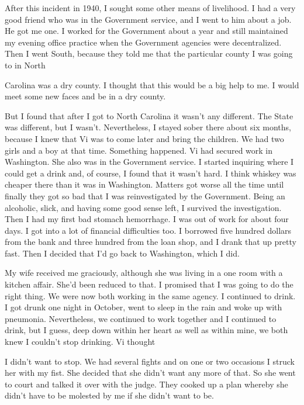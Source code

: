 \begin{biblechapter}
After this incident in 1940, I sought some other means of livelihood. I had a very good friend who was in the Government service, and I went to him about a job. He got me one. I worked for the Government about a year and still maintained my evening office practice when the Government agencies were decentralized. Then I went South, because they told me that the particular county I was going to in North

Carolina was a dry county. I thought that this would be a big help to me. I would meet some new faces and be in a dry county.

But I found that after I got to North Carolina it wasn’t any different. The State was different, but I wasn’t. Nevertheless, I stayed sober there about six months, because I knew that Vi was to come later and bring the children. We had two girls and a boy at that time. Something happened. Vi had secured work in Washington. She also was in the Government service. I started inquiring where I could get a drink and, of course, I found that it wasn’t hard. I think whiskey was cheaper there than it was in Washington. Matters got worse all the time until finally they got so bad that I was reinvestigated by the Government. Being an alcoholic, slick, and having some good sense left, I survived the investigation. Then I had my first bad stomach hemorrhage. I was out of work for about four days. I got into a lot of financial difficulties too. I borrowed five hundred dollars from the bank and three hundred from the loan shop, and I drank that up pretty fast. Then I decided that I’d go back to Washington, which I did.

My wife received me graciously, although she was living in a one room with a kitchen affair. She’d been reduced to that. I promised that I was going to do the right thing. We were now both working in the same agency. I continued to drink. I got drunk one night in October, went to sleep in the rain and woke up with pneumonia. Nevertheless, we continued to work together and I continued to drink, but I guess, deep down within her heart as well as within mine, we both knew I couldn’t stop drinking. Vi thought

I didn’t want to stop. We had several fights and on one or two occasions I struck her with my fist. She decided that she didn’t want any more of that. So she went to court and talked it over with the judge. They cooked up a plan whereby she didn’t have to be molested by me if she didn’t want to be.


\end{biblechapter}
